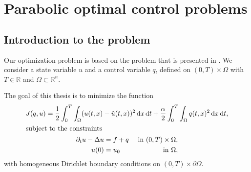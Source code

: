 \chapter{\label{capterParabolicOptimalControlProblems}Parabolic optimal control problems}

\section{Introduction to the problem}
Our optimization problem is based on the problem that is presented in \cite{doi:10.1137/070694016}. We consider a state variable $u$ and a control variable $q$, defined on $(0,T)\times\Omega$ with $T\in\mathbb{R}$ and $\Omega\subset\mathbb{R}^n$.

The goal of this thesis is to minimize the function
\begin{subequations}
\label{conProb}
\begin{gather}
J(q,u)=\frac{1}{2}\int_0^T\int_\Omega(u(t,x)-\hat{u}(t,x))^2\,\mathrm{d}x\,\mathrm{d}t+\frac{\alpha}{2}\int_0^T\int_\Omega q(t,x)^2\,\mathrm{d}x\,\mathrm{d}t\label{objFun},\\
\intertext{subject to the constraints}
\begin{aligned}
	\partial_tu-\Delta u&=f+q&\text{ in }(0,T)\times\Omega,\\
	u(0)&=u_0&\text{ in }\Omega,
\end{aligned}
\label{constraints}
\end{gather}
\end{subequations}
with homogeneous Dirichlet boundary conditions on $(0,T)\times\partial\Omega$.


